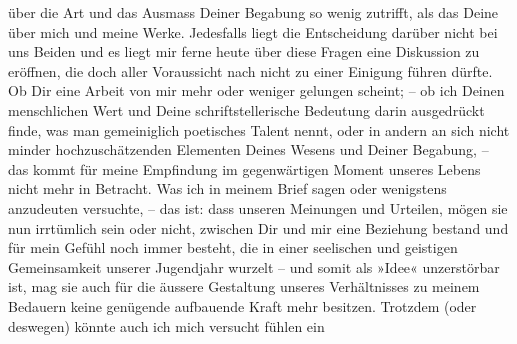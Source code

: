 \begin{ledgroupsized}[t]{13cm}
               über die Art und das Ausmass Deiner Begabung so wenig zutrifft, als das Deine über
               mich und meine Werke.\pend
           \pstart
           Jedesfalls liegt die Entscheidung darüber nicht bei uns Beiden und es liegt mir ferne
                  heute über diese Fragen eine Diskussion zu
               eröffnen, die doch aller Voraussicht nach nicht zu einer Einigung führen dürfte.\pend
           \pstart
           Ob Dir eine Arbeit von mir mehr oder weniger gelungen scheint; – ob ich Deinen
               menschlichen Wert und Deine schriftstellerische Bedeutung darin ausgedrückt finde,
               was man gemeiniglich poetisches Talent nennt, oder in andern an sich nicht minder
               hochzuschätzenden Elementen Deines Wesens und Deiner Begabung, – das kommt für meine
               Empfindung im gegenwärtigen Moment unseres Lebens nicht mehr in Betracht.\pend
           \pstart
           Was ich in meinem Brief sagen oder wenigstens anzudeuten versuchte, – das ist: dass
                   unseren Meinungen und Urteilen, mögen sie nun
               irrtümlich sein oder nicht, zwischen Dir und mir eine Beziehung bestand und für mein
               Gefühl noch immer besteht, die in einer seelischen und geistigen Gemeinsamkeit
               unserer Jugendjahr wurzelt – und somit als »Idee« unzerstörbar ist, mag sie auch {\pb}für die äussere Gestaltung unseres Verhältnisses zu
               meinem Bedauern keine genügende aufbauende Kraft mehr besitzen.\pend
           \pstart
           Trotzdem (oder deswegen) könnte auch ich mich versucht fühlen ein \label{K_L03519-2v}
\end{ledgroupsized}
